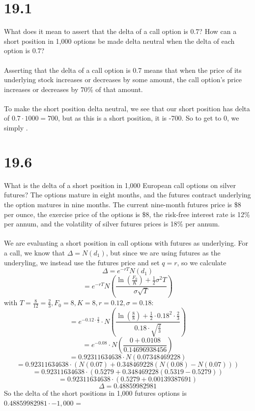 \documentclass{article}
\begin{document}
\thispagestyle{firstpageheader}
{\Large 

\section*{19.1}
What does it mean to assert that the delta of a call option is 0.7? How can a short position in 1,000 options be made delta neutral when the delta of each option is 0.7? \\ \\
Asserting that the delta of a call option is 0.7 means that when the price of its underlying stock increases or decreases by some amount, the call option's price increases or decreases by 70\% of that amount. \\ \\
To make the short position delta neutral, we see that our short position has delta of \(0.7 \cdot 1000 = 700\), but as this is a short position, it is -700. So to get to 0, we simply .

}
{\Large 

\section*{19.6}
What is the delta of a short position in 1,000 European call options on silver futures? The options mature in eight months, and the futures contract underlying the option matures in nine months. The current nine-month futures price is \$8 per ounce, the exercise price of the options is \$8, the risk-free interest rate is 12\% per annum, and the volatility of silver futures prices is 18\% per annum. \\ \\
We are evaluating a short position in call options with futures as underlying. For a call, we know that \(\Delta = N(d_1)\), but since we are using futures as the underyling, we instead use the futures price and set \(q = r\), so we calculate 
\[
  \Delta = e^{-rT} N(d_1)
\]
\[
  = e^{-rT} N(\frac{\ln(\frac{F_0}{K}) + \frac{1}{2} \sigma^2 T}{\sigma \sqrt{T}})
\]
with \(T = \frac{8}{12} = \frac{2}{3}, F_0 = 8, K = 8, r = 0.12, \sigma = 0.18\):
\[
  = e^{-0.12 \cdot \frac{2}{3}} \cdot N(\frac{\ln(\frac{8}{8}) + \frac{1}{2} \cdot 0.18^2 \cdot \frac{2}{3}}{0.18 \cdot \sqrt{\frac{2}{3}}})
\]
\[
  = e^{-0.08} \cdot N(\frac{0 + 0.0108}{0.14696938456})
\]
\[
  = 0.92311634638 \cdot N(0.07348469228)
\]
\[
  = 0.92311634638 \cdot (N(0.07) + 0.348469228(N(0.08) - N(0.07)))
\]
\[
  = 0.92311634638 \cdot (0.5279 +  0.348469228(0.5319 - 0.5279))
\]
\[
  = 0.92311634638 \cdot (0.5279 +  0.00139387691)
\]
\[
  \Delta = 0.48859982981
\]
So the delta of the short positions in 1,000 futures options is \(0.48859982981 \cdot -1,000\) = 

}
\end{document}
